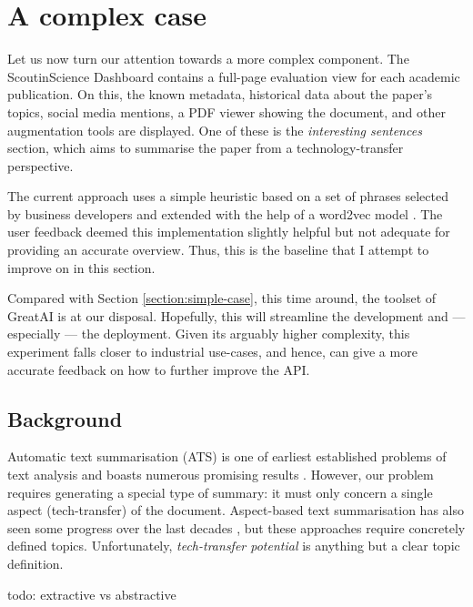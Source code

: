 \section{A complex case}

Let us now turn our attention towards a more complex component. The ScoutinScience Dashboard contains a full-page evaluation view for each academic publication. On this, the known metadata, historical data about the paper's topics, social media mentions, a PDF viewer showing the document, and other augmentation tools are displayed. One of these is the \textit{interesting sentences} section, which aims to summarise the paper from a technology-transfer perspective.

The current approach uses a simple heuristic based on a set of phrases selected by business developers and extended with the help of a word2vec model \cite{mikolov2013efficient}. The user feedback deemed this implementation slightly helpful but not adequate for providing an accurate overview. Thus, this is the baseline that I attempt to improve on in this section.

\begin{displayquote}
Compared with Section \ref{section:simple-case}, this time around, the toolset of GreatAI is at our disposal. Hopefully, this will streamline the development and --- especially --- the deployment. Given its arguably higher complexity, this experiment falls closer to industrial use-cases, and hence, can give a more accurate feedback on how to further improve the API.
\end{displayquote}

\subsection{Background}

Automatic text summarisation (ATS) is one of earliest established problems of text analysis and boasts numerous promising results \cite{el2021automatic}. However, our problem requires generating a special type of summary: it must only concern a single aspect (tech-transfer) of the document. Aspect-based text summarisation has also seen some progress over the last decades \cite{berkovsky2008aspect,hayashi2021wikiasp}, but these approaches require concretely defined topics. Unfortunately, \textit{tech-transfer potential} is anything but a clear topic definition.

todo: extractive vs abstractive

